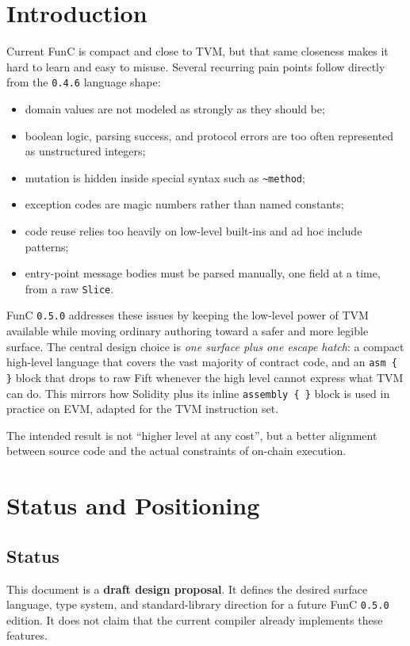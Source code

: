 \documentclass[12pt,oneside]{article}
\begin{document}
\section*{Introduction}
Current FunC is compact and close to TVM, but that same closeness makes
it hard to learn and easy to misuse. Several recurring pain points
follow directly from the \verb|0.4.6| language shape:

\begin{itemize}
\item domain values are not modeled as strongly as they should be;
\item boolean logic, parsing success, and protocol errors are too often
represented as unstructured integers;
\item mutation is hidden inside special syntax such as \verb|~method|;
\item exception codes are magic numbers rather than named constants;
\item code reuse relies too heavily on low-level built-ins and ad hoc
include patterns;
\item entry-point message bodies must be parsed manually, one field at
a time, from a raw \verb|Slice|.
\end{itemize}

FunC \verb|0.5.0| addresses these issues by keeping the low-level power
of TVM available while moving ordinary authoring toward a safer and
more legible surface. The central design choice is \emph{one surface
plus one escape hatch}: a compact high-level language that covers the
vast majority of contract code, and an \verb|asm { }| block that drops
to raw Fift whenever the high level cannot express what TVM can do.
This mirrors how Solidity plus its inline \verb|assembly { }| block is
used in practice on EVM, adapted for the TVM instruction set.

The intended result is not ``higher level at any cost'', but a better
alignment between source code and the actual constraints of on-chain
execution.

\clearpage
\tableofcontents

\clearpage
\section{Status and Positioning}
\subsection{Status}
This document is a \textbf{draft design proposal}. It defines the desired
surface language, type system, and standard-library direction for a future FunC
\verb|0.5.0| edition. It does not claim that the current compiler already
implements these features.
\end{document}
